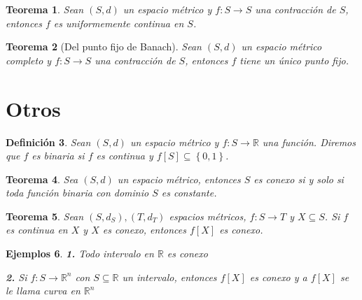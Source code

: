 \documentclass[oneside]{book} %
\theoremstyle{Teorema}
\newtheorem{Definicion}{Definición}[chapter]
\newtheorem{Teorema}[Definicion]{Teorema}
\theoremstyle{Ejemplos}
\newtheorem{Ejemplos}[Definicion]{Ejemplos}
\theoremstyle{[Obs]}
\renewcommand{\{}{\left\lbrace} %
\renewcommand{\}}{\right\rbrace} %
\renewcommand{\sc}{\subseteq} %
\newcommand{\R}{\mathbb{R}} %
\newcommand{\Rn}{\mathbb{R}^n} %
\begin{document}
			\begin{Teorema}

				Sean $(S, d)$ un espacio métrico y $f : S \to S$ una contracción de $S$, entonces $f$ es uniformemente continua en $S$. \\

			\end{Teorema}

			\begin{Teorema}[Del punto fijo de Banach]

				Sean $(S, d)$ un espacio métrico completo y $f : S \to S$ una contracción de $S$, entonces $f$ tiene un único punto fijo. \\

			\end{Teorema}

		\section{Otros} 

			\begin{Definicion}\setlength{\parindent}{0em}

				Sean $(S, d)$ un espacio métrico y $f : S \to \R$ una función. Diremos que $f$ es binaria si $f$ es continua y $f[S] \sc \{ 0, 1 \}$. 

			\end{Definicion}

			\begin{Teorema}\setlength{\parindent}{0em}

				Sea $(S, d)$ un espacio métrico, entonces $S$ es conexo si y solo si toda función binaria con dominio $S$ es constante.

			\end{Teorema}

			\begin{Teorema}\setlength{\parindent}{0em}

				Sean $(S, d_S), (T, d_T)$ espacios métricos, $f : S \to T$ y $X \sc S$. Si $f$ es continua en $X$ y $X$ es conexo, entonces $f[X]$ es conexo.

			\end{Teorema}

			\begin{Ejemplos}\setlength{\parindent}{0em}

				\textbf{1.} Todo intervalo en $\R$ es conexo

				\textbf{2.} Si $f : S \to \Rn$ con $S \sc \R$ un intervalo, entonces $f[X]$ es conexo y a $f[X]$ se le llama curva en $\Rn$

			\end{Ejemplos}
\end{document}
